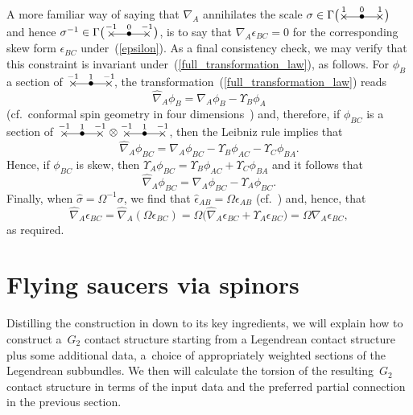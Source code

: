 \documentclass[pdftex]{sigma}%
\numberwithin{equation}{section}
\newcommand{\xox}[3]{\begin{picture}(40,11)
\put(4,1.5){\makebox(0,0){$\times$}}
\put(20,1.5){\makebox(0,0){$\bullet$}}
\put(36,1.5){\makebox(0,0){$\times$}}
\put(4,1.5){\line(1,0){32}}
\put(4,8){\makebox(0,0){$\scriptstyle #1$}}
\put(20,8){\makebox(0,0){$\scriptstyle #2$}}
\put(36,8){\makebox(0,0){$\scriptstyle #3$}}
\end{picture}}
\begin{document}
A more familiar way \cite{OT} of saying that $\nabla_A$ annihilates the scale
$\sigma\in\Gamma\big(\xox{1}{0}{1}\big)$ and hence
$\sigma^{-1}\in\Gamma\big(\,\xox{-1}{0}{-1}\,\big)$, is to say that
$\nabla_A\epsilon_{BC}=0$ for the corresponding skew form $\epsilon_{BC}$
under~(\ref{epsilon}). As a final consistency check, we may verify that this
constraint is invariant under~(\ref{full_transformation_law}), as follows. For
$\phi_B$ a section of $\,\xox{-1}{1}{-1}$, the transformation~(\ref{full_transformation_law}) reads
\[\widehat\nabla_A\phi_B=\nabla_A\phi_B-\Upsilon_B\phi_A\]
(cf.~conformal spin geometry in four
dimensions~\cite[equation~(5.6.15)]{OT}) and, therefore, if $\phi_{BC}$ is a
section of $\,\xox{-1}{1}{-1}\,\otimes\,\xox{-1}{1}{-1}\,$, then the Leibniz
rule implies that
\[\widehat\nabla_A\phi_{BC}
=\nabla_A\phi_{BC}-\Upsilon_B\phi_{AC}-\Upsilon_C\phi_{BA}.\]
Hence, if $\phi_{BC}$ is skew, then
$\Upsilon_A\phi_{BC}=\Upsilon_B\phi_{AC}+\Upsilon_C\phi_{BA}$ and it follows
that
\[\widehat\nabla_A\phi_{BC}=\nabla_A\phi_{BC}-\Upsilon_A\phi_{BC}.\]
Finally, when $\widehat\sigma=\Omega^{-1}\sigma$, we find that
$\widehat{\epsilon}_{AB}=\Omega\epsilon_{AB}$ (cf.~\cite[equation~(5.6.2)]{OT})
and, hence, that
\[\widehat\nabla_A\widehat\epsilon_{BC}
=\widehat\nabla_A(\Omega\epsilon_{BC})
=\Omega\big(\widehat\nabla_A\epsilon_{BC}+\Upsilon_A\epsilon_{BC}\big)
=\Omega\nabla_A\epsilon_{BC},\]
as required.

\section{Flying saucers via spinors}\label{saucers}
Distilling the construction in \cite{EN2} down to its key ingredients, we
will explain how to construct a~$G_2$ contact structure starting from a
Legendrean contact structure plus some additional data, a~choice of
appropriately weighted sections of the Legendrean subbundles. We then will
calculate the torsion of the resulting~$G_2$ contact structure in terms of the
input data and the preferred partial connection in the previous section.
\end{document}
